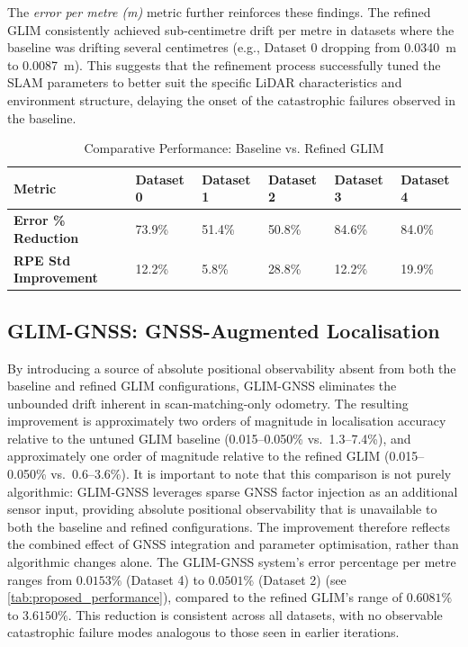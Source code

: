 The \textit{error per metre (m)} metric further reinforces these findings. The refined GLIM consistently achieved sub-centimetre drift per metre in datasets where the baseline was drifting several centimetres (e.g., Dataset 0 dropping from 0.0340~m to 0.0087~m). This suggests that the refinement process successfully tuned the SLAM parameters to better suit the specific LiDAR characteristics and environment structure, delaying the onset of the catastrophic failures observed in the baseline.

\begin{table}[htbp]
\centering
\caption{Comparative Performance: Baseline vs. Refined GLIM}
\label{tab:comparison_summary}
\begin{tabularx}{\textwidth}{lXXXXX}
\toprule
\textbf{Metric} & \textbf{Dataset 0} & \textbf{Dataset 1} & \textbf{Dataset 2} & \textbf{Dataset 3} & \textbf{Dataset 4} \\ \midrule
\textbf{Error \% Reduction} & 73.9\% & 51.4\% & 50.8\% & 84.6\% & 84.0\% \\
\textbf{RPE Std Improvement} & 12.2\% & 5.8\% & 28.8\% & 12.2\% & 19.9\% \\ \bottomrule
\end{tabularx}
\end{table}

\subsection{GLIM-GNSS: GNSS-Augmented Localisation}

By introducing a source of absolute positional observability absent from both the baseline and refined GLIM configurations, GLIM-GNSS eliminates the unbounded drift inherent in scan-matching-only odometry. The resulting improvement is approximately two orders of magnitude in localisation accuracy relative to the untuned GLIM baseline (0.015–0.050\% vs.\ 1.3–7.4\%), and approximately one order of magnitude relative to the refined GLIM (0.015–0.050\% vs.\ 0.6–3.6\%). It is important to note that this comparison is not purely algorithmic: GLIM-GNSS leverages sparse GNSS factor injection as an additional sensor input, providing absolute positional observability that is unavailable to both the baseline and refined configurations. The improvement therefore reflects the combined effect of GNSS integration and parameter optimisation, rather than algorithmic changes alone. The GLIM-GNSS system's error percentage per metre ranges from $0.0153\%$ (Dataset 4) to $0.0501\%$ (Dataset 2) (see \cref{tab:proposed_performance}), compared to the refined GLIM's range of $0.6081\%$ to $3.6150\%$. This reduction is consistent across all datasets, with no observable catastrophic failure modes analogous to those seen in earlier iterations.


